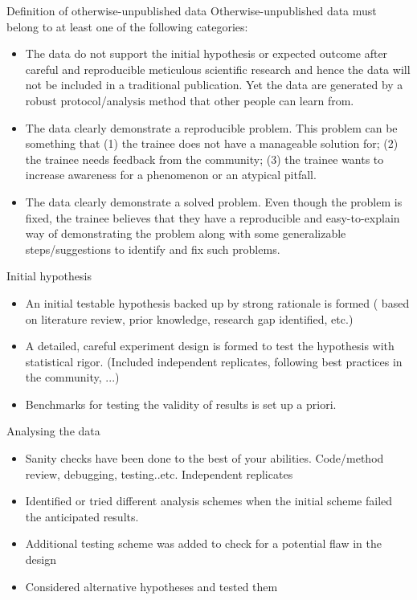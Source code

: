 \documentclass[9pt,lessons]{livecoms}
\theoremstyle{definition}
\theoremstyle{remark}
\begin{document}
\begin{Checklists*}[p!]

\begin{checklist}{Definition of otherwise-unpublished data}
Otherwise-unpublished data must belong to at least one of the following categories:
\begin{itemize}
\item The data do not support the initial hypothesis or expected outcome after careful and reproducible meticulous scientific research and hence the data will not be included in a traditional publication. Yet the data are generated by a robust protocol/analysis method that other people can 
learn from.
\item The data clearly demonstrate a reproducible problem. This problem can be something that (1) the trainee does not have a manageable solution for; (2) the trainee needs feedback from the community; (3) the trainee wants to increase awareness for a phenomenon or an atypical pitfall. 
\item The data clearly demonstrate a solved problem. Even though the problem is fixed, the trainee believes that they have a reproducible and easy-to-explain way of demonstrating the problem along with some generalizable steps/suggestions to identify and fix such problems.
\end{itemize}  
\end{checklist}

\begin{checklist}{Initial hypothesis}
\begin{itemize}
\item An initial testable hypothesis backed up by strong rationale is formed ( based on literature review, prior knowledge, research gap identified, etc.)
\item A detailed, careful experiment design is formed to test the hypothesis with statistical rigor.
(Included independent replicates, following best practices in the community, ...) 
\item Benchmarks for testing the validity of results is set up a priori.
\end{itemize}
\end{checklist}

\begin{checklist}{Analysing the data}
\begin{itemize}
\item Sanity checks have been done to the best of your abilities.
Code/method review, debugging, testing..etc. Independent replicates   
\item Identified or tried different analysis schemes when the initial scheme failed the anticipated results.
\item Additional testing scheme was added to check for a potential flaw in the design
\item Considered alternative hypotheses and tested them
\end{itemize}
\end{checklist}


\end{Checklists*}
\end{document}
